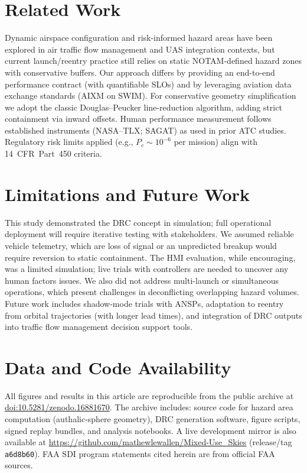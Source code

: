\documentclass[journal]{new-aiaa}
\newcommand{\DRC}{\textsc{DRC}}
\newcommand{\AIXM}{\textsc{AIXM}}
\newcommand{\SWIM}{\textsc{SWIM}}
\newcommand{\repoURL}{https://github.com/mathewlewallen/Mixed-Use_Skies}
\newcommand{\repoCommit}{a6d8b60}
\newcommand{\repoDOI}{10.5281/zenodo.16881670}
\begin{document}
\section{Related Work}
Dynamic airspace configuration and risk-informed hazard areas have been explored in air traffic flow management and UAS integration contexts, but current launch/reentry practice still relies on static NOTAM-defined hazard zones with conservative buffers.\cite{CRS2019} Our approach differs by providing an end-to-end performance contract (with quantifiable SLOs) and by leveraging aviation data exchange standards (\AIXM{} on \SWIM{}). For conservative geometry simplification we adopt the classic Douglas–Peucker line-reduction algorithm,\cite{DouglasPeucker} adding strict containment via inward offsets. Human performance measurement follows established instruments (NASA--TLX; SAGAT) as used in prior ATC studies.\cite{NASA_TLX,Endsley_SAGAT} Regulatory risk limits applied (e.g., $P_c\sim10^{-6}$ per mission) align with 14~CFR~Part~450 criteria.\cite{CFR450}

\section{Limitations and Future Work}
This study demonstrated the \DRC{} concept in simulation; full operational deployment will require iterative testing with stakeholders. We assumed reliable vehicle telemetry, which are loss of signal or an unpredicted breakup would require reversion to static containment. The HMI evaluation, while encouraging, was a limited simulation; live trials with controllers are needed to uncover any human factors issues. We also did not address multi-launch or simultaneous operations, which present challenges in deconflicting overlapping hazard volumes. Future work includes shadow-mode trials with ANSPs, adaptation to reentry from orbital trajectories (with longer lead times), and integration of \DRC{} outputs into traffic flow management decision support tools.

\section*{Data and Code Availability}
All figures and results in this article are reproducible from the public archive at \href{https://doi.org/\repoDOI}{doi:\repoDOI}. The archive includes: source code for hazard area computation (authalic-sphere geometry), \DRC{} generation software, figure scripts, signed replay bundles, and analysis notebooks. A live development mirror is also available at \href{\repoURL}{\repoURL} (release/tag \texttt{\repoCommit}). FAA SDI program statements cited herein are from official FAA sources.\cite{FAA_SDI_2021,FAA_SDI_2024}
\end{document}
